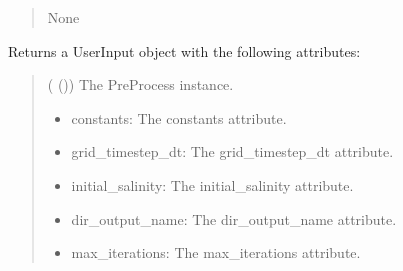 \documentclass[a4paper,11pt,english,openany]{sphinxmanual}
\begin{document}
\begin{fulllineitems}
\begin{fulllineitems}
\begin{quote}
\begin{description}
\sphinxAtStartPar
None

\end{description}\end{quote}

\end{fulllineitems}


\begin{fulllineitems}
\label{\detokenize{api/spyice.preprocess.pre_process:src.spyice.preprocess.pre_process.PreProcess.get_userinput}}
\pysigstartsignatures
\pysiglinewithargsret
{}
{}
{}
\pysigstopsignatures
\sphinxAtStartPar
Returns a UserInput object with the following attributes:
\begin{quote}\begin{description}
\sphinxAtStartPar
{} ({\hyperref[\detokenize{api/spyice.preprocess.pre_process:src.spyice.preprocess.pre_process.PreProcess}]{}} ()) \textendash{} The PreProcess instance.

\sphinxAtStartPar
\begin{description}
\begin{itemize}
\item {} 
\sphinxAtStartPar
constants: The constants attribute.

\item {} 
\sphinxAtStartPar
grid\_timestep\_dt: The grid\_timestep\_dt attribute.

\item {} 
\sphinxAtStartPar
initial\_salinity: The initial\_salinity attribute.

\item {} 
\sphinxAtStartPar
dir\_output\_name: The dir\_output\_name attribute.

\item {} 
\sphinxAtStartPar
max\_iterations: The max\_iterations attribute.

\end{itemize}


\end{description}
\end{description}
\end{quote}
\end{fulllineitems}
\end{fulllineitems}
\end{document}
